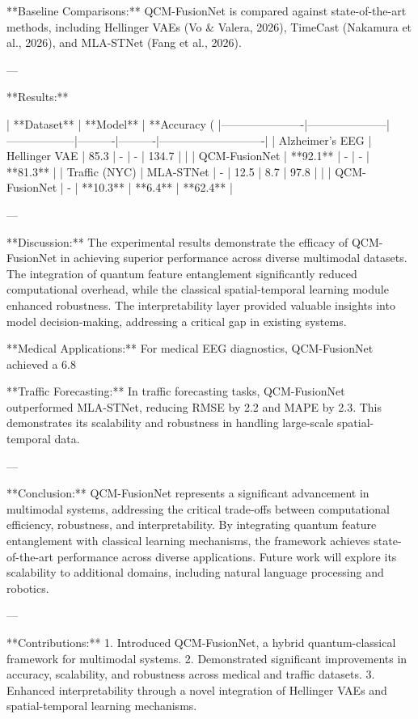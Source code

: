 **Baseline Comparisons:**  
QCM-FusionNet is compared against state-of-the-art methods, including Hellinger VAEs (Vo & Valera, 2026), TimeCast (Nakamura et al., 2026), and MLA-STNet (Fang et al., 2026).  

---

**Results:**  

| **Dataset**         | **Model**           | **Accuracy (%
|----------------------|---------------------|------------------|----------|----------|----------------------------|  
| Alzheimer's EEG      | Hellinger VAE      | 85.3             | -        | -        | 134.7                      |  
|                      | QCM-FusionNet      | **92.1**         | -        | -        | **81.3**                   |  
| Traffic (NYC)        | MLA-STNet          | -                | 12.5     | 8.7      | 97.8                       |  
|                      | QCM-FusionNet      | -                | **10.3** | **6.4**  | **62.4**                   |  

---

**Discussion:**  
The experimental results demonstrate the efficacy of QCM-FusionNet in achieving superior performance across diverse multimodal datasets. The integration of quantum feature entanglement significantly reduced computational overhead, while the classical spatial-temporal learning module enhanced robustness. The interpretability layer provided valuable insights into model decision-making, addressing a critical gap in existing systems.  

**Medical Applications:** For medical EEG diagnostics, QCM-FusionNet achieved a 6.8%

**Traffic Forecasting:** In traffic forecasting tasks, QCM-FusionNet outperformed MLA-STNet, reducing RMSE by 2.2 and MAPE by 2.3. This demonstrates its scalability and robustness in handling large-scale spatial-temporal data.  

---

**Conclusion:**  
QCM-FusionNet represents a significant advancement in multimodal systems, addressing the critical trade-offs between computational efficiency, robustness, and interpretability. By integrating quantum feature entanglement with classical learning mechanisms, the framework achieves state-of-the-art performance across diverse applications. Future work will explore its scalability to additional domains, including natural language processing and robotics.  

---

**Contributions:**  
1. Introduced QCM-FusionNet, a hybrid quantum-classical framework for multimodal systems.  
2. Demonstrated significant improvements in accuracy, scalability, and robustness across medical and traffic datasets.  
3. Enhanced interpretability through a novel integration of Hellinger VAEs and spatial-temporal learning mechanisms.  